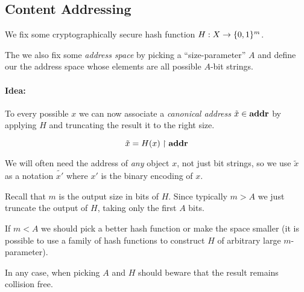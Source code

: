 
\subsection{Content Addressing}

We fix some cryptographically secure hash function $H:X\to  \{0,1\} ^{m} $.

The we also fix some \emph{address space} by picking a ``size-parameter'' $A$ and define our the address space whose elements are all possible $A$-bit strings.


\paragraph{Idea:}

To every possible  $x$ we can now associate a \emph{canonical address} $\tilde{x} \in {\textbf{addr}}$ by applying $H$ and truncating the result it to the right size.

\[
	\tilde{x} = H(x) \restriction {\textbf{addr}}
\]

We will often need the address of \emph{any} object $x$, not just bit strings, so we use $\tilde{x}$ as a notation $\tilde{x'}$ where $x'$ is the binary encoding of $x$.


Recall that $m$ is the output size in bits of $H$. Since typically $m>A$ we just truncate the output of $H$, taking only the first $A$ bits.

If $m<A$ we should pick a better hash function or make the space smaller (it is possible to use a family of hash functions to construct $H$ of arbitrary large $m$-parameter).

In any case, when picking $A$ and $H$ should beware that the result remains collision free.


